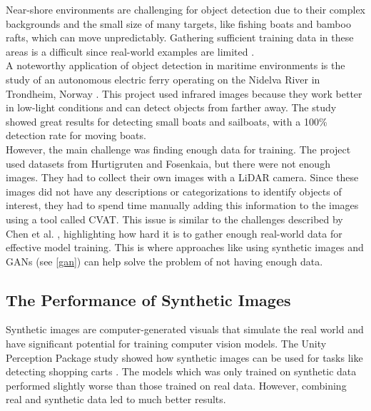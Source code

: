 \noindent Near-shore environments are challenging for object detection due to their complex backgrounds and the small size of many targets, like fishing boats and bamboo rafts, which can move unpredictably. Gathering sufficient training data in these areas is a difficult since real-world examples are limited \cite{safety}.\\

\noindent A noteworthy application of object detection in maritime environments is the study of an autonomous electric ferry operating on the Nidelva River in Trondheim, Norway \cite{NTNUFerry}. This project used infrared images because they work better in low-light conditions and can detect objects from farther away. The study showed great results for detecting small boats and sailboats, with a 100\% detection rate for moving boats. \\

\noindent However, the main challenge was finding enough data for training. The project used datasets from Hurtigruten and Fosenkaia, but there were not enough images. They had to collect their own images with a LiDAR camera. Since these images did not have any descriptions or categorizations to identify objects of interest, they had to spend time manually adding this information to the images using a tool called CVAT. This issue is similar to the challenges described by Chen et al. \cite{safety}, highlighting how hard it is to gather enough real-world data for effective model training. This is where approaches like using synthetic images and GANs (see \ref{gan}) can help solve the problem of not having enough data. \\

\subsection{The Performance of Synthetic Images}

Synthetic images are computer-generated visuals that simulate the real world and have significant potential for training computer vision models. The Unity Perception Package study showed how synthetic images can be used for tasks like detecting shopping carts \cite{borkman2021unityperceptiongeneratesynthetic}. The models which was only trained on synthetic data performed slightly worse than those trained on real data. However, combining real and synthetic data led to much better results. \\

